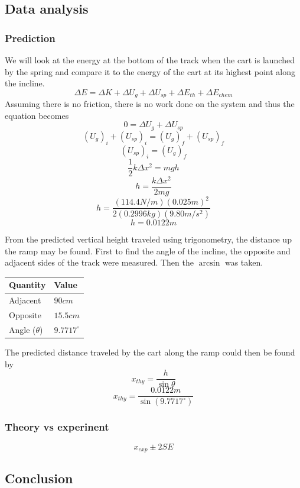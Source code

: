 \documentclass[11pt, letterpaper, includehead]{article}
\begin{document}
\subsection{Data analysis}
\subsubsection{Prediction}
We will look at the energy at the bottom of the track when the cart is launched by 
the spring and compare it to the energy of the cart at its highest point along the incline.
$$\Delta E = \Delta K + \Delta U_{g} + \Delta U_{sp} + \Delta E_{th} + \Delta E_{chem}$$
Assuming there is no friction, there is no work done on the system and thus
the equation becomes 
$$0 = \Delta U_{g} + \Delta U_{sp}$$
$$(U_{g})_i + (U_{sp})_i = (U_{g})_f + (U_{sp})_f$$
$$(U_{sp})_i = (U_{g})_f$$
$$\frac{1}{2}k\Delta x^2 = mgh$$
$$h = \frac{k\Delta x^2}{2mg}$$
$$h = \frac{(114.4 N/m) (0.025m)^2}{2 (0.2996kg)(9.80m/s^2)}$$
$$\boxed{h = 0.0122m}$$

From the predicted vertical height traveled using trigonometry, the distance up the ramp may be found.
First to find the angle of the incline, the opposite and adjacent sides of the track were measured. Then
the $\arcsin$ was taken.

\begin{center} 
  \begin{tabular}{|  m{3cm} | m{3cm} | } 
    \hline 
    \textbf{Quantity} & \textbf{Value}\\
    \hline
    Adjacent & $90cm$ \\ 
    \hline
    Opposite & $15.5cm$ \\ 
    \hline
    Angle ($\theta$) & $9.7717^{\circ}$ \\ 
    \hline      
  \end{tabular} 
\end{center}

The predicted distance traveled by the cart along the ramp could then be
found by 
$$x_{thy} = \frac{h}{\sin \theta}$$
$$x_{thy} = \frac{0.0122m}{\sin(9.7717^{\circ})}$$

\subsubsection{Theory vs experinent}
$$x_{exp} \pm 2SE$$


\subsection{Conclusion}
\end{document}
